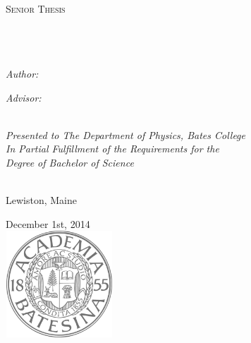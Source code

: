 \documentclass[11pt, oneside]{Thesis} %
\begin{document}
\begin{titlepage}
\begin{center}

\textsc{\LARGE \univname}\\[1.5cm] %
\textsc{\Large Senior Thesis}\\[0.5cm] %

\HRule \\[0.4cm] %
{\huge \bfseries \ttitle}\\[0.4cm] %
\HRule \\[1.5cm] %
 
\begin{minipage}{0.4\textwidth}
\begin{flushleft} \large
\emph{Author:}\\
\href{http://www.peterkrieg.com/thesis}{\authornames} %
\end{flushleft}
\end{minipage}
\begin{minipage}{0.4\textwidth}
\begin{flushright} \large
\emph{Advisor:} \\
\href{http://www.jamessmith.com}{\supname} %
\end{flushright}
\end{minipage}\\[3cm]
 
\large \textit{Presented to The Department of Physics, Bates College\\ In Partial Fulfillment of the Requirements for the \\ Degree of Bachelor of Science}\\[0.3cm] %

\

 \large Lewiston, Maine 
 \

{\large December 1st, 2014}\\[2cm] %
\includegraphics[width=4cm, height=4cm]{logotransparent.png} %
 
\vfill
\end{center}

\end{titlepage}
\end{document}
